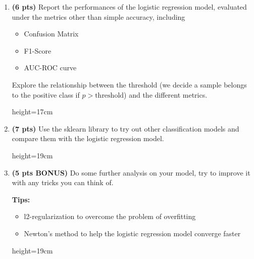 \begin{enumerate}
    \begin{soln}{height=19cm}
    \end{soln}
    \clearpage
    \item \textbf{(6 pts)} Report the performances of the logistic regression model, evaluated under the metrics other than simple accuracy, including
    \begin{itemize}
        \item Confusion Matrix
        \item F1-Score
        \item AUC-ROC curve
    \end{itemize}
    Explore the relationship between the threshold (we decide a sample belongs to the positive class if $p>\text{threshold}$) and the different metrics.
    \begin{soln}{height=17cm}
    \end{soln}
    \clearpage
    \item \textbf{(7 pts)} Use the sklearn library to try out other classification models and compare them with the logistic regression model.
    \begin{soln}{height=19cm}
    \end{soln}
    \clearpage
    \item \textbf{(5 pts BONUS)} Do some further analysis on your model, try to improve it with any tricks you can think of.
    
    \textbf{Tips:}
    \begin{itemize}
        \item l2-regularization to overcome the problem of overfitting
        \item Newton's method to help the logistic regression model converge faster
    \end{itemize}
    \begin{soln}{height=19cm}
    \end{soln}
\end{enumerate}           





